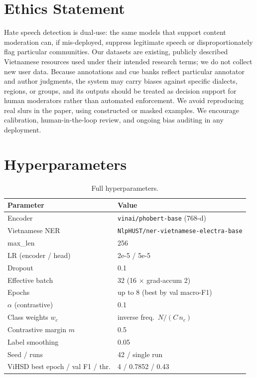 \documentclass[11pt]{article}
\begin{document}
\section*{Ethics Statement}
Hate speech detection is dual-use: the same models that support content moderation can, if mis-deployed, suppress legitimate speech or disproportionately flag particular communities. Our datasets are existing, publicly described Vietnamese resources used under their intended research terms; we do not collect new user data. Because annotations and cue banks reflect particular annotator and author judgments, the system may carry biases against specific dialects, regions, or groups, and its outputs should be treated as decision support for human moderators rather than automated enforcement. We avoid reproducing real slurs in the paper, using constructed or masked examples. We encourage calibration, human-in-the-loop review, and ongoing bias auditing in any deployment.




\appendix

\section{Hyperparameters}
\label{sec:hparams}
\begin{table}[h]
  \centering
  \small
  \begin{tabular}{ll}
    \toprule
    \textbf{Parameter} & \textbf{Value} \\
    \midrule
    Encoder & \texttt{vinai/phobert-base} (768-d) \\
    Vietnamese NER & \texttt{NlpHUST/ner-vietnamese-electra-base} \\
    max\_len & 256 \\
    LR (encoder / head) & 2e-5 / 5e-5 \\
    Dropout & 0.1 \\
    Effective batch & 32 (16 $\times$ grad-accum 2) \\
    Epochs & up to 8 (best by val macro-F1) \\
    $\alpha$ (contrastive) & 0.1 \\
    Class weights $w_c$ & inverse freq.\ $N/(C\,n_c)$ \\
    Contrastive margin $m$ & 0.5 \\
    Label smoothing & 0.05 \\
    Seed / runs & 42 / single run \\
    ViHSD best epoch / val F1 / thr. & 4 / 0.7852 / 0.43 \\
    \bottomrule
  \end{tabular}
  \caption{Full hyperparameters.}
  \label{tab:hparams}
\end{table}
\end{document}
